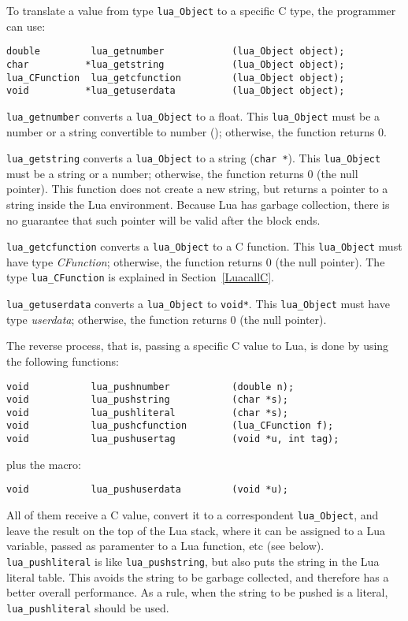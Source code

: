 To translate a value from type \verb'lua_Object' to a specific C type,
the programmer can use:
\begin{verbatim}
double         lua_getnumber            (lua_Object object);
char          *lua_getstring            (lua_Object object);
lua_CFunction  lua_getcfunction         (lua_Object object);
void          *lua_getuserdata          (lua_Object object);
\end{verbatim}
\verb'lua_getnumber' converts a \verb'lua_Object' to a float.
This \verb'lua_Object' must be a number or a string convertible to number
(); otherwise, the function returns 0.

\verb'lua_getstring' converts a \verb'lua_Object' to a string (\verb'char *').
This \verb'lua_Object' must be a string or a number;
otherwise, the function returns 0 (the null pointer).
This function does not create a new string, but returns a pointer to
a string inside the Lua environment.
Because Lua has garbage collection, there is no guarantee that such
pointer will be valid after the block ends.

\verb'lua_getcfunction' converts a \verb'lua_Object' to a C function.
This \verb'lua_Object' must have type {\em CFunction\/};
otherwise, the function returns 0 (the null pointer).
The type \verb'lua_CFunction' is explained in Section~\ref{LuacallC}.

\verb'lua_getuserdata' converts a \verb'lua_Object' to \verb'void*'.
This \verb'lua_Object' must have type {\em userdata\/};
otherwise, the function returns 0 (the null pointer).

The reverse process, that is, passing a specific C value to Lua,
is done by using the following functions:
\begin{verbatim}
void           lua_pushnumber           (double n);
void           lua_pushstring           (char *s);
void           lua_pushliteral          (char *s);
void           lua_pushcfunction        (lua_CFunction f);
void           lua_pushusertag          (void *u, int tag);
\end{verbatim}
plus the macro:
\begin{verbatim}
void           lua_pushuserdata         (void *u);
\end{verbatim}
All of them receive a C value,
convert it to a correspondent \verb'lua_Object',
and leave the result on the top of the Lua stack,
where it can be assigned to a Lua variable,
passed as paramenter to a Lua function, etc (see below). \label{pushing}
\verb'lua_pushliteral' is like \verb'lua_pushstring',
but also puts the string in the Lua literal table.
This avoids the string to be garbage collected,
and therefore has a better overall performance.
As a rule, when the string to be pushed is a literal,
\verb'lua_pushliteral' should be used.

